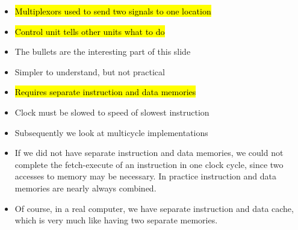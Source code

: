 \begin{frame}[fragile]
\begin{itemize}
\item \hl{Multiplexors used to send two signals to one location}
\item \hl{Control unit tells other units what to do}
\end{itemize}
\BNotes\ifnum{}
\begin{itemize}
\item The bullets are the interesting part of this slide
\end{itemize}
\fi\ENotes
\end{frame}


\begin{frame}[fragile]
\begin{itemize}
\item Simpler to understand, but not practical
\item \hl{Requires separate instruction and data memories}
\item Clock must be slowed to speed of slowest instruction
\item Subsequently we look at multicycle implementations
\end{itemize}
\BNotes\ifnum{}
\begin{itemize}
\item If we did not have separate instruction and data memories, we could
	not complete the fetch-execute of an instruction in one clock cycle,
	since two accesses to memory may be necessary. In practice instruction
	and data memories are nearly always combined.
\item Of course, in a real computer, we have separate instruction and data
	cache, which is very much like having two separate memories.
\end{itemize}
\fi\ENotes
\end{frame}



